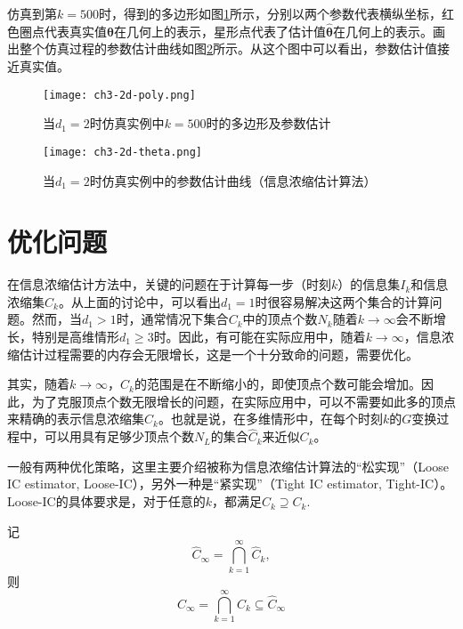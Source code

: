仿真到第$k=500$时，得到的多边形如图\ref{fig.3.poly}所示，分别以两个参数代表横纵坐标，红色圈点代表真实值$\bm{\theta}$在几何上的表示，星形点代表了估计值$\hat{\bm{\theta}}$在几何上的表示。画出整个仿真过程的参数估计曲线如图\ref{fig.3.theta.hat}所示。从这个图中可以看出，参数估计值接近真实值。
\begin{figure}[!h]
	\centering
	\texttt{[image: ch3-2d-poly.png]}\\	 %
	\caption{当$d_{1}=2$时仿真实例中$k=500$时的多边形及参数估计}
	\label{fig.3.poly}
\end{figure}

\begin{figure}[!h]
	\centering
	\texttt{[image: ch3-2d-theta.png]}\\	 %
	\caption{当$d_{1}=2$时仿真实例中的参数估计曲线（信息浓缩估计算法）}
	\label{fig.3.theta.hat}
\end{figure}

\section{优化问题}\label{sect:3.5}
在信息浓缩估计方法中，关键的问题在于计算每一步（时刻$k$）的信息集$I_{k}$和信息浓缩集$C_{k}$。从上面的讨论中，可以看出$d_{1}=1$时很容易解决这两个集合的计算问题。然而，当$d_{1}>1$时，通常情况下集合$C_{k}$中的顶点个数$N_{k}$随着$k\rightarrow\infty$会不断增长，特别是高维情形$d_{1}\geq3$时。因此，有可能在实际应用中，随着$k\rightarrow\infty$，信息浓缩估计过程需要的内存会无限增长，这是一个十分致命的问题，需要优化。

其实，随着$k\rightarrow\infty$，$C_{k}$的范围是在不断缩小的，即使顶点个数可能会增加。因此，为了克服顶点个数无限增长的问题，在实际应用中，可以不需要如此多的顶点来精确的表示信息浓缩集$C_{k}$。也就是说，在多维情形中，在每个时刻$k$的$G$变换过程中，可以用具有足够少顶点个数$N_{L}$的集合$\hat{C}_{k}$来近似$C_{k}$。

一般有两种优化策略，这里主要介绍被称为信息浓缩估计算法的“松实现”（Loose IC estimator, Loose-IC），另外一种是“紧实现”（Tight IC estimator, Tight-IC）。Loose-IC的具体要求是，对于任意的$k$，都满足$\hat{C}_k\supseteq C_k$.

记$$\hat{C}_{\infty}=\bigcap\limits_{k=1}^{\infty} \hat{C}_{k},$$
则
\begin{equation}\label{eq.loose}
C_{\infty}=\bigcap\limits_{k=1}^{\infty} C_{k}\subseteq \hat{C}_{\infty}
\end{equation}

